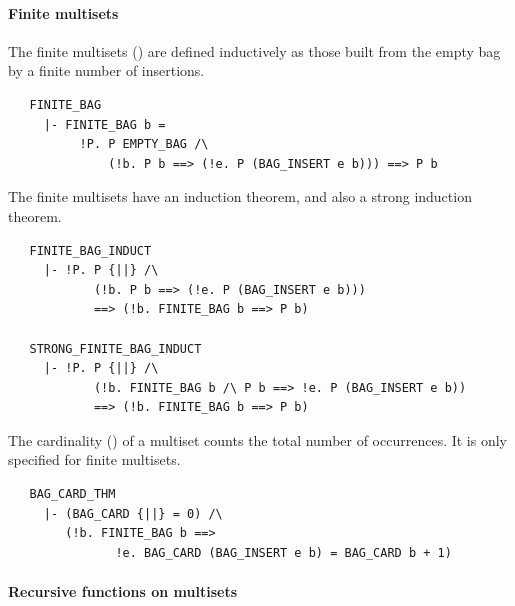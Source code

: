 {\paragraph {Finite multisets}
The finite multisets () are defined inductively as
those built from the empty bag by a finite number of insertions.
%
\begin{hol}
\begin{verbatim}
   FINITE_BAG
     |- FINITE_BAG b =
          !P. P EMPTY_BAG /\
              (!b. P b ==> (!e. P (BAG_INSERT e b))) ==> P b
\end{verbatim}
\end{hol}
%
The finite multisets have an induction theorem, and also a strong
induction theorem.
%
%
\begin{hol}
\begin{verbatim}
   FINITE_BAG_INDUCT
     |- !P. P {||} /\
            (!b. P b ==> (!e. P (BAG_INSERT e b)))
            ==> (!b. FINITE_BAG b ==> P b)

   STRONG_FINITE_BAG_INDUCT
     |- !P. P {||} /\
            (!b. FINITE_BAG b /\ P b ==> !e. P (BAG_INSERT e b))
            ==> (!b. FINITE_BAG b ==> P b)
\end{verbatim}
\end{hol}
%
The cardinality () of a multiset counts the
total number of occurrences. It is only specified for finite multisets.
%
\begin{hol}
\begin{verbatim}
   BAG_CARD_THM
     |- (BAG_CARD {||} = 0) /\
        (!b. FINITE_BAG b ==>
               !e. BAG_CARD (BAG_INSERT e b) = BAG_CARD b + 1)
\end{verbatim}
\end{hol}

\paragraph{Recursive functions on multisets}

}
